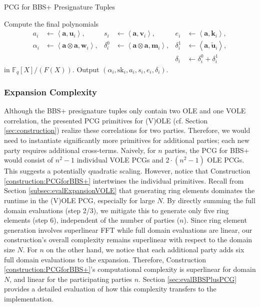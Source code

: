 \begin{specialconstruction}{PCG for BBS+ Presignature Tuples}
\begin{algorithmic}[1]
\State Compute the final polynomials
\begin{align*}
a_{i} & \leftarrow \left\langle\boldsymbol{a}, \boldsymbol{u}_{i}\right\rangle, & 
s_{i} & \leftarrow \left\langle\boldsymbol{a}, \boldsymbol{v}_{i}\right\rangle, &
e_{i} & \leftarrow \left\langle\boldsymbol{a}, \boldsymbol{k}_{i}\right\rangle, \\
\alpha_{i} & \leftarrow \left\langle\boldsymbol{a} \otimes \boldsymbol{a},  \boldsymbol{w}_{i}\right\rangle, & 
\delta_{i}^{0} & \leftarrow \left\langle\boldsymbol{a} \otimes \boldsymbol{a},  \boldsymbol{m}_{i}\right\rangle, & 
\delta_{i}^{1} & \leftarrow \left\langle\boldsymbol{a},  \widetilde{\boldsymbol{u}}_{i}\right\rangle, \\
& & & & \delta_{i} & \leftarrow \delta_{i}^{0} + \delta_{i}^{1}
\end{align*}
in $\mathbb{F}_{q}[X] / (F(X))$. Output $\left(\alpha_{i}, \mathrm{sk}_{i}, a_{i}, s_{i}, e_{i}, \delta_{i}\right)$.
\end{algorithmic}
\end{specialconstruction}



\subsubsection{Expansion Complexity}
Although the BBS+ presignature tuples only contain two OLE and one VOLE correlation, the presented PCG primitives for (V)OLE (cf. Section \ref{sec:construction}) realize these correlations for two parties. Therefore, we would need to instantiate significantly more primitives for additional parties; each new party requires additional cross-terms. Naively, for $n$ parties, the PCG for BBS+ would consist of $n^2-1$ individual VOLE PCGs and $2\cdot(n^2-1)$ OLE PCGs. This suggests a potentially quadratic scaling. However, notice that Construction \ref{construction:PCGforBBS+} intertwines the individual primitives. Recall from Section \ref{subsec:evalExpansionVOLE} that generating ring elements dominates the runtime in the (V)OLE PCG, especially for large $N$. By directly summing the full domain evaluations (step 2/3), we mitigate this to generate only five ring elements (step 6), independent of the number of parties ($n$). Since ring element generation involves superlinear FFT while full domain evaluations are linear, our construction's overall complexity remains superlinear with respect to the domain size $N$. For $n$ on the other hand, we notice that each additional party adds six full domain evaluations to the expansion. Therefore, Construction \ref{construction:PCGforBBS+}'s computational complexity is superlinear for domain $N$, and linear for the participating parties $n$. Section \ref{sec:evalBBSPlusPCG} provides a detailed evaluation of how this complexity transfers to the implementation.

